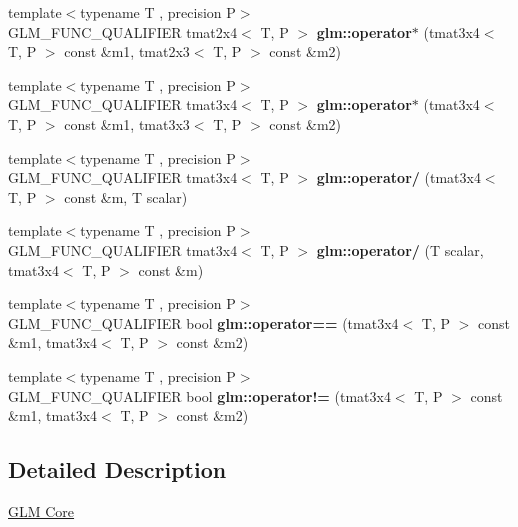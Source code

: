 \begin{DoxyCompactItemize}
\item 
\mbox{\label{type__mat3x4_8inl_a057892ce2a71e76f21025327e4347f10}} 
{\footnotesize template$<$typename T , precision P$>$ }\\G\+L\+M\+\_\+\+F\+U\+N\+C\+\_\+\+Q\+U\+A\+L\+I\+F\+I\+ER tmat2x4$<$ T, P $>$ {\bfseries glm\+::operator$\ast$} (tmat3x4$<$ T, P $>$ const \&m1, tmat2x3$<$ T, P $>$ const \&m2)
\item 
\mbox{\label{type__mat3x4_8inl_a12c934eeec1b9ef7a759ab1941f55038}} 
{\footnotesize template$<$typename T , precision P$>$ }\\G\+L\+M\+\_\+\+F\+U\+N\+C\+\_\+\+Q\+U\+A\+L\+I\+F\+I\+ER tmat3x4$<$ T, P $>$ {\bfseries glm\+::operator$\ast$} (tmat3x4$<$ T, P $>$ const \&m1, tmat3x3$<$ T, P $>$ const \&m2)
\item 
\mbox{\label{type__mat3x4_8inl_a2c00b14561d6fdfbcce059b1d354ddda}} 
{\footnotesize template$<$typename T , precision P$>$ }\\G\+L\+M\+\_\+\+F\+U\+N\+C\+\_\+\+Q\+U\+A\+L\+I\+F\+I\+ER tmat3x4$<$ T, P $>$ {\bfseries glm\+::operator/} (tmat3x4$<$ T, P $>$ const \&m, T scalar)
\item 
\mbox{\label{type__mat3x4_8inl_abd6120fa3b2bc164f9278363543f7d1e}} 
{\footnotesize template$<$typename T , precision P$>$ }\\G\+L\+M\+\_\+\+F\+U\+N\+C\+\_\+\+Q\+U\+A\+L\+I\+F\+I\+ER tmat3x4$<$ T, P $>$ {\bfseries glm\+::operator/} (T scalar, tmat3x4$<$ T, P $>$ const \&m)
\item 
\mbox{\label{type__mat3x4_8inl_a6ce503e89acc786363ee712f65b845d4}} 
{\footnotesize template$<$typename T , precision P$>$ }\\G\+L\+M\+\_\+\+F\+U\+N\+C\+\_\+\+Q\+U\+A\+L\+I\+F\+I\+ER bool {\bfseries glm\+::operator==} (tmat3x4$<$ T, P $>$ const \&m1, tmat3x4$<$ T, P $>$ const \&m2)
\item 
\mbox{\label{type__mat3x4_8inl_a39503545e324d1a4846ad10aee597a1e}} 
{\footnotesize template$<$typename T , precision P$>$ }\\G\+L\+M\+\_\+\+F\+U\+N\+C\+\_\+\+Q\+U\+A\+L\+I\+F\+I\+ER bool {\bfseries glm\+::operator!=} (tmat3x4$<$ T, P $>$ const \&m1, tmat3x4$<$ T, P $>$ const \&m2)
\end{DoxyCompactItemize}


\subsection{Detailed Description}
\hyperlink{group__core}{G\+LM Core} 